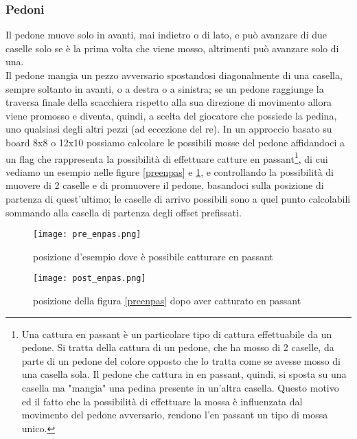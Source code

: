 \subsubsection{Pedoni}
Il pedone muove solo in avanti, mai indietro o di lato, e può avanzare  di due caselle solo se è la prima volta che viene mosso, altrimenti può avanzare solo di una.
\\Il pedone mangia un pezzo avversario spostandosi diagonalmente di una casella, sempre soltanto in avanti, o a destra o a sinistra; se un pedone raggiunge la traversa finale della scacchiera rispetto alla sua direzione di movimento
allora viene promosso e diventa, quindi, a scelta del giocatore che possiede la pedina, uno qualsiasi degli altri pezzi (ad eccezione del re).
In un approccio basato su board 8x8 o 12x10 possiamo calcolare le possibili mosse del pedone affidandoci a un flag che rappresenta la possibilità di effettuare catture en passant\footnote{
Una cattura en passant è un particolare tipo di cattura effettuabile da un pedone. Si tratta della cattura di un pedone, che ha mosso di 2 caselle, da parte di un pedone del colore opposto che lo tratta come se avesse mosso di una casella sola. Il pedone che cattura in en passant, quindi, si sposta su una casella ma "mangia" una pedina presente in un'altra casella. Questo motivo ed il fatto che la possibilità di effettuare la mossa è influenzata dal movimento del pedone avversario, rendono l'en passant un tipo di mossa unico.}, di cui vediamo un esempio
nelle figure \ref{preenpas} e \ref{postenpas}, e controllando la possibilità 
di muovere di 2 caselle e di promuovere il pedone, basandoci sulla posizione di partenza di quest'ultimo; le caselle di arrivo possibili sono a quel punto calcolabili sommando alla casella di partenza degli offset prefissati.


\begin{figure}
    \centering
    \begin{minipage}{0.45\textwidth}
        \centering
        \texttt{[image: pre\_enpas.png]} %
        \caption{posizione d'esempio dove è possibile catturare en passant}
        \label{preenpas}

    \end{minipage}\hfill
    \begin{minipage}{0.45\textwidth}
        \centering
        \texttt{[image: post\_enpas.png]} %
        \caption{posizione della figura \ref{preenpas} dopo aver catturato en passant }
        \label{postenpas}
    \end{minipage}
\end{figure}





